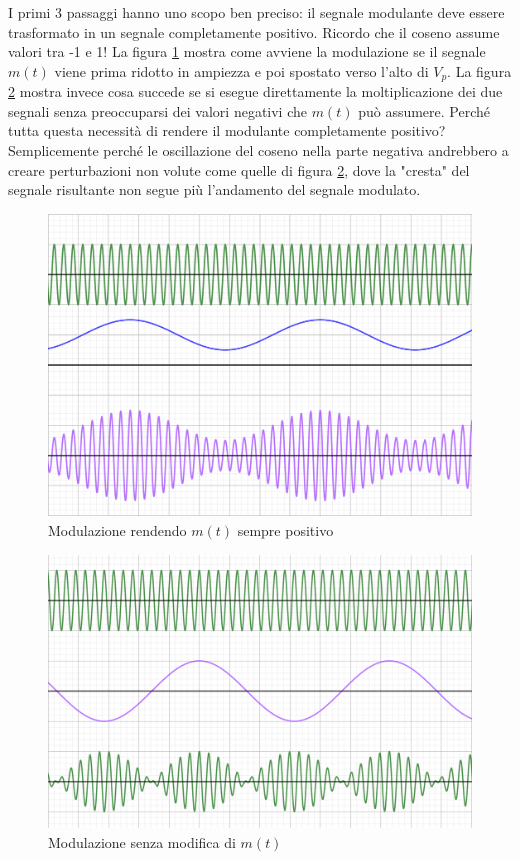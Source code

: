 \documentclass[11pt,a4paper]{article}
\begin{document}
I primi 3 passaggi hanno uno scopo ben preciso: il segnale modulante deve essere trasformato in un segnale completamente positivo. Ricordo che il coseno assume valori tra -1 e 1! La figura \ref{fig:using_scaling} mostra come avviene la modulazione se il segnale $m(t)$ viene prima ridotto in ampiezza e poi spostato verso l'alto di $V_p$. La figura \ref{fig:not_using_scaling} mostra invece cosa succede se si esegue direttamente la moltiplicazione dei due segnali senza preoccuparsi dei valori negativi che $m(t)$ può assumere. Perché tutta questa necessità di rendere il modulante completamente positivo? Semplicemente perché le oscillazione del coseno nella parte negativa andrebbero a creare perturbazioni non volute come quelle di figura \ref{fig:not_using_scaling}, dove la "cresta" del segnale risultante non segue più l'andamento del segnale modulato.

\begin{figure}
  \includegraphics[width=\linewidth]{images/us.png}
  \caption{Modulazione rendendo $m(t)$ sempre positivo}
  \label{fig:using_scaling}
\end{figure}

\begin{figure}
  \includegraphics[width=\linewidth]{images/nus.png}
  \caption{Modulazione senza modifica di $m(t)$}
  \label{fig:not_using_scaling}
\end{figure}
\end{document}
